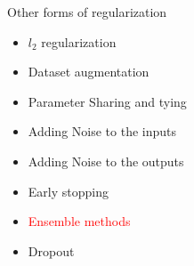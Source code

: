\begin{frame}
\end{frame}

\begin{frame}
	\vspace{4em}
	\begin{overlayarea}{\textwidth}{\textheight}
		\begin{block}{Other forms of regularization}
			\begin{itemize}
				\item $l_2$ regularization
				\item Dataset augmentation
				\item Parameter Sharing and tying
				\item Adding Noise to the inputs
				\item Adding Noise to the outputs 
				\item Early stopping
				\item \textcolor<2->{red}{Ensemble methods}
				\item Dropout
			\end{itemize}
		\end{block}
	\end{overlayarea}
\end{frame}

